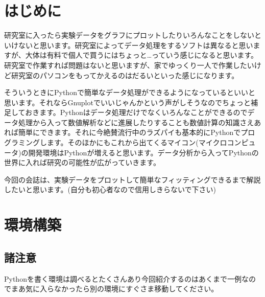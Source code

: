 \documentclass[11pt,b5paper,papersize,dvipdfmx]{jsbook}
\begin{document}


%
\section*{はじめに}
研究室に入ったら実験データをグラフにプロットしたりいろんなことをしないといけないと思います。研究室によってデータ処理をするソフトは異なると思いますが、大体は有料で個人で買うにはちょっと…っていう感じになると思います。研究室で作業すれば問題はないと思いますが、家でゆっくり一人で作業したいけど研究室のパソコンをもってかえるのはだるいといった感じになります。\par
そういうときにPythonで簡単なデータ処理ができるようになっているといいと思います。それならGnuplotでいいじゃんかという声がしそうなのでちょっと補足しておきます。Pythonはデータ処理だけでなくいろんなことができるのでデータ処理から入って数値解析などに進展したりすることも数値計算の知識さえあれば簡単にできます。それに今絶賛流行中のラズパイも基本的にPythonでプログラミングします。そのほかにもこれから出てくるマイコン(マイクロコンピュータ)の開発環境はPythonが増えると思います。データ分析から入ってPythonの世界に入れば研究の可能性が広がっていきます。\par
今回の会誌は、実験データをプロットして簡単なフィッティングできるまで解説したいと思います。(自分も初心者なので信用しきらないで下さい)
\section{環境構築}
%
\subsection{諸注意}
Pythonを書く環境は調べるとたくさんあり今回紹介するのはあくまで一例なのでまあ気に入らなかったら別の環境にすぐさま移動してください。
%
\end{document}
